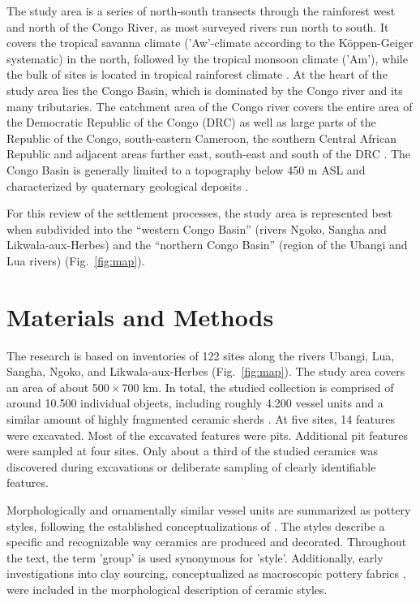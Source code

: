 \documentclass[smallextended,natbib]{svjour3}       %
\begin{document}
The study area is a series of north-south transects through the rainforest west and north of the Congo River, as most surveyed rivers run north to south. It covers the tropical savanna climate ('Aw'-climate according to the Köppen-Geiger systematic) in the north, followed by the tropical monsoon climate ('Am'), while the bulk of sites is located in tropical rainforest climate \citep['Af';][]{Peel.2007}. At the heart of the study area lies the Congo Basin, which is dominated by the Congo river and its many tributaries. The catchment area of the Congo river covers the entire area of the Democratic Republic of the Congo (DRC) as well as large parts of the Republic of the Congo, south-eastern Cameroon, the southern Central African Republic and adjacent areas further east, south-east and south of the DRC \citep[60 Fig. 1]{Eggert.2017}. The Congo Basin is generally limited to a topography below 450 m ASL \citep[11]{Runge.2001} and characterized by quaternary geological deposits \citep{Persits.1997}.

For this review of the settlement processes, the study area is represented best when subdivided into the “western Congo Basin” (rivers Ngoko, Sangha and Likwala-aux-Herbes) and the “northern Congo Basin” (region of the Ubangi and Lua rivers) (Fig.~\ref{fig:map}).

\section*{Materials and Methods}\label{materials}

The research is based on inventories of 122 sites along the rivers Ubangi, Lua, Sangha, Ngoko, and Likwala-aux-Herbes (Fig.~\ref{fig:map}). The study area covers an area of about 500\,$\times$\,700 km. In total, the studied collection is comprised of around 10.500 individual objects, including roughly 4.200 vessel units and a similar amount of highly fragmented ceramic sherds \citep[23--43]{Seidensticker.2021e}. At five sites, 14 features were excavated. Most of the excavated features were pits. Additional pit features were sampled at four sites. Only about a third of the studied ceramics was discovered during excavations or deliberate sampling of clearly identifiable features.

Morphologically and ornamentally similar vessel units are summarized as pottery styles, following the established conceptualizations of \citet[52--57]{Wotzka.1995}. The styles describe a specific and recognizable way ceramics are produced and decorated. Throughout the text, the term 'group' is used synonymous for 'style'. Additionally, early investigations into clay sourcing, conceptualized as macroscopic pottery fabrics \citep[60--69]{Seidensticker.2021e}, were included in the morphological description of ceramic styles.
\end{document}
